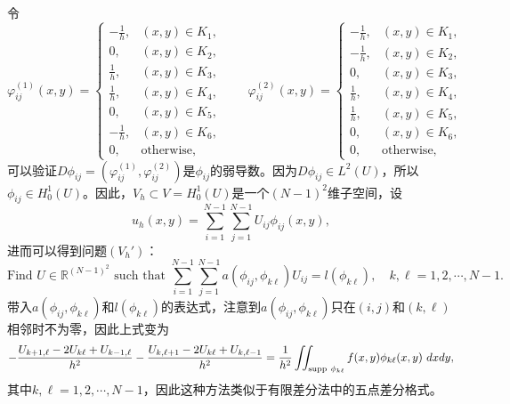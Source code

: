 \documentclass[a4paper,10pt]{ctexart}
\begin{document}
令
\[
    \varphi_{ij}^{(1)}(x,y) = 
    \begin{cases}
        -\frac{1}{h}, & (x,y)\in K_1,\\
        0, & (x,y)\in K_2,\\
        \frac{1}{h}, & (x,y)\in K_3,\\
        \frac{1}{h}, & (x,y)\in K_4,\\
        0, & (x,y)\in K_5,\\
        -\frac{1}{h}, & (x,y)\in K_6,\\
        0, & \text{otherwise},
    \end{cases}\qquad
    \varphi_{ij}^{(2)}(x,y) =
    \begin{cases}
        -\frac{1}{h}, & (x,y)\in K_1,\\
        -\frac{1}{h}, & (x,y)\in K_2,\\
        0, & (x,y)\in K_3,\\
        \frac{1}{h}, & (x,y)\in K_4,\\
        \frac{1}{h}, & (x,y)\in K_5,\\
        0, & (x,y)\in K_6,\\
        0, & \text{otherwise},
    \end{cases}
\]
可以验证$ D\phi_{ij}=(\varphi^{(1)}_{ij},\varphi^{(2)}_{ij}) $是$ \phi_{ij} $的弱导数。因为$ D\phi_{ij}\in L^2(U) $，所以$ \phi_{ij}\in H^1_0(U) $。因此，$ V_h\subset V=H^1_0(U) $是一个$ (N-1)^2 $维子空间，设
\[
    u_h(x,y) = \sum_{i=1}^{N-1}\sum_{j=1}^{N-1} U_{ij}\phi_{ij}(x,y),
\]
进而可以得到问题$ (V_h') $：
\begin{equation}
    \text{Find } U\in \mathbb{R}^{(N-1)^2} \text{ such that } \sum_{i=1}^{N-1}\sum_{j=1}^{N-1}a(\phi_{ij},\phi_{k\ell})U_{ij} = l(\phi_{k\ell}),\quad k,\ell=1,2,\cdots ,N-1.
\end{equation}
带入$ a(\phi_{ij},\phi_{k\ell}) $和$ l(\phi_{k\ell}) $的表达式，注意到$ a(\phi_{ij},\phi_{k\ell}) $只在$ (i,j) $和$ (k,\ell) $相邻时不为零，因此上式变为
\begin{equation}
    -\frac{U_{k+1,\ell}-2U_{k\ell}+U_{k-1,\ell}}{h^2} - \frac{U_{k,\ell+1}-2U_{k\ell}+U_{k,\ell-1}}{h^2} = \frac{1}{h^2}\iint_{{\rm supp}\ \phi_{k\ell}}f(x,y)\phi_{k\ell}(x,y)\ dxdy,
\end{equation}
其中$ k,\ell = 1,2,\cdots ,N-1 $，因此这种方法类似于有限差分法中的五点差分格式。
\end{document}
